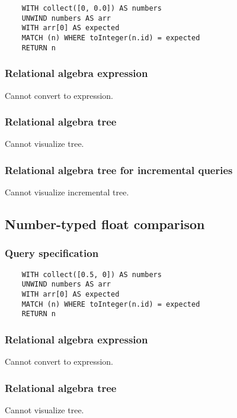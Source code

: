 	\begin{lstlisting}
	WITH collect([0, 0.0]) AS numbers
	UNWIND numbers AS arr
	WITH arr[0] AS expected
	MATCH (n) WHERE toInteger(n.id) = expected
	RETURN n
	\end{lstlisting}


	\subsubsection*{Relational algebra expression}

	Cannot convert to expression.

	\subsubsection*{Relational algebra tree}

	Cannot visualize tree.

	\subsubsection*{Relational algebra tree for incremental queries}

	Cannot visualize incremental tree.
	\subsection{Number-typed float comparison}

	\subsubsection*{Query specification}

	\begin{lstlisting}
	WITH collect([0.5, 0]) AS numbers
	UNWIND numbers AS arr
	WITH arr[0] AS expected
	MATCH (n) WHERE toInteger(n.id) = expected
	RETURN n
	\end{lstlisting}


	\subsubsection*{Relational algebra expression}

	Cannot convert to expression.

	\subsubsection*{Relational algebra tree}

	Cannot visualize tree.

